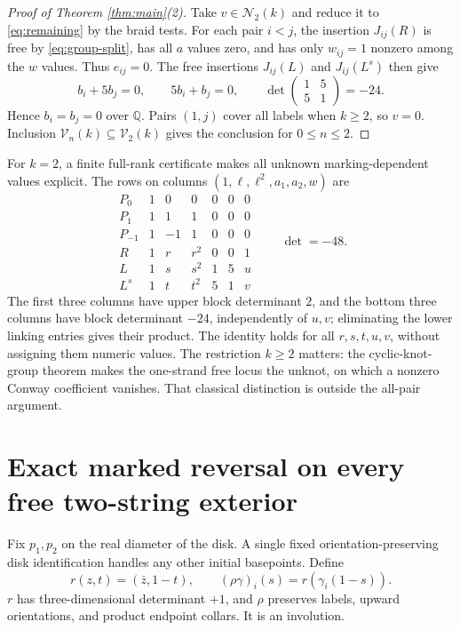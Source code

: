 \documentclass[11pt]{article}
\theoremstyle{remark}\newtheorem{remark}[theorem]{Remark}
\newcommand{\Q}{\mathbb Q}
\newcommand{\V}{\mathcal V}
\newcommand{\N}{\mathcal N}
\begin{document}
\begin{proof}[Proof of Theorem \ref{thm:main}(2)]
Take $v\in\N_2(k)$ and reduce it to \eqref{eq:remaining} by the braid tests.
For each pair $i<j$, the insertion $J_{ij}(R)$ is free by
\eqref{eq:group-split}, has all $a$ values zero, and has only $w_{ij}=1$
nonzero among the $w$ values. Thus $e_{ij}=0$. The free insertions
$J_{ij}(L)$ and $J_{ij}(L^s)$ then give
\[
b_i+5b_j=0,\qquad5b_i+b_j=0,\qquad
\det\begin{pmatrix}1&5\\5&1\end{pmatrix}=-24.
\]
Hence $b_i=b_j=0$ over $\Q$. Pairs $(1,j)$ cover all labels when $k\geq2$,
so $v=0$. Inclusion $\V_n(k)\subseteq\V_2(k)$ gives the conclusion for
$0\leq n\leq2$.
\end{proof}
For $k=2$, a finite full-rank certificate makes all unknown marking-dependent
values explicit. The rows on columns $(1,\ell,\ell^2,a_1,a_2,w)$ are
\begin{equation}\label{eq:six-matrix}
\begin{array}{c|rrrrrr}
P_0&1&0&0&0&0&0\\
P_1&1&1&1&0&0&0\\
P_{-1}&1&-1&1&0&0&0\\
R&1&r&r^2&0&0&1\\
L&1&s&s^2&1&5&u\\
L^s&1&t&t^2&5&1&v
\end{array}
\qquad\det=-48.
\end{equation}
The first three columns have upper block determinant $2$, and the bottom
three columns have block determinant $-24$, independently of $u,v$;
eliminating the lower linking entries gives their product. The identity
holds for all $r,s,t,u,v$, without assigning them numeric values.
The restriction $k\geq2$ matters: the cyclic-knot-group theorem makes the
one-strand free locus the unknot, on which a nonzero Conway coefficient
vanishes. That classical distinction is outside the all-pair argument.

\section{Exact marked reversal on every free two-string exterior}
Fix $p_1,p_2$ on the real diameter of the disk. A single fixed
orientation-preserving disk identification handles any other initial
basepoints. Define
\begin{equation}\label{eq:rho}
r(z,t)=(\bar z,1-t),\qquad(\rho\gamma)_i(s)=r(\gamma_i(1-s)).
\end{equation}
$r$ has three-dimensional determinant $+1$, and $\rho$ preserves labels,
upward orientations, and product endpoint collars. It is an involution.
\end{document}
